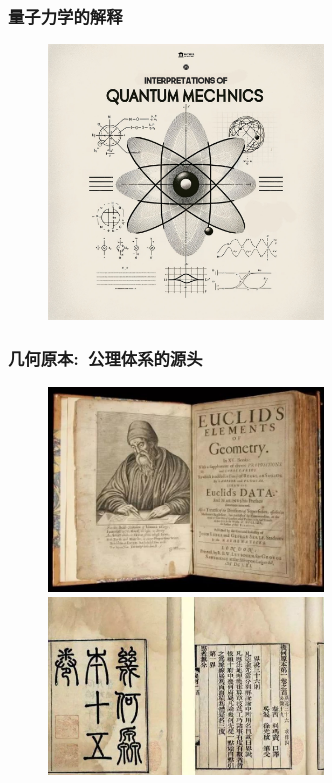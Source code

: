 {\frame
{
	\frametitle{量子力学的解释}
\begin{figure}[h!]
\centering
\vspace{-12.5pt}
\includegraphics[height=0.745\textwidth,width=0.65\textwidth,viewport=300 150 1800 1870,clip]{Figures/Interpretation-QM.png}
\caption{\fontsize{5.2pt}{3.9pt}}
\label{Interpretation-QM}
\end{figure}
}

\frame
{
	\frametitle{几何原本:~公理体系的源头}
\begin{figure}[h!]
\centering
\vspace{-13pt}
\includegraphics[height=0.38\textwidth,width=0.65\textwidth,viewport=0 0 680 500,clip]{Figures/Element_Geometry_1.jpg}\\
\vspace{1pt}
\includegraphics[height=0.36\textwidth,width=0.65\textwidth,viewport=0 0 810 500,clip]{Figures/Element_Geometry_2.jpg}
\label{Element_Geometru}
\end{figure}
}

}
